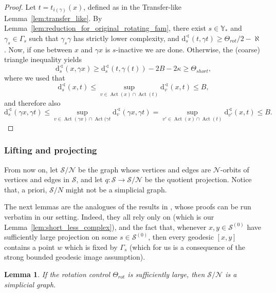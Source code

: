 \documentclass[svgnames]{amsart}
\theoremstyle{plain}
\newtheorem{lemma}[thm]{Lemma}
\theoremstyle{definition}
\newcommand{\dist}{\mathrm{d}}
\newcommand{\Act}{\operatorname{Act}}
\newcommand{\N}{\mathcal{N}}
\newcommand{\calS}{\mathcal{S}}
\renewcommand{\angle}{\sphericalangle}
\begin{document}
\begin{proof}
Let $t=t_{i(\gamma)}(x)$, defined as in the Transfer-like Lemma~\ref{lem:transfer_like}. By Lemma~\ref{lem:reduction_for_original_rotating_fam}, there exist $s \in \mathbb{Y}_*$ and $\gamma_s\in\Gamma_s$ such that $\gamma_s\gamma$ has strictly lower complexity, and $\dist^\angle_s(t, \gamma t)\ge \Theta_{rot}/2-\aleph$. Now, if one between $x$ and $\gamma x$ is $s$-inactive we are done. Otherwise, the (coarse) triangle inequality yields
$$\dist^\angle_s(x,\gamma x)\ge \dist^\angle_s(t,\gamma (t))-2 B-2\kappa \ge \Theta_{short},$$
where we used that 
$$\dist^\angle_s(x,t)\le \sup_{v\in\Act(x)\cap \Act(t)}\dist^\angle_v(x,t)\le B,$$
and therefore also 
$$\dist^\angle_s(\gamma x,\gamma t)\le \sup_{v\in\Act(\gamma x)\cap \Act(\gamma t}\dist^\angle_v(\gamma x,\gamma t)=\sup_{v'\in\Act(x)\cap \Act(t)}\dist^\angle_{v'}(x,t)\le B.$$
\end{proof}




\subsubsection{Lifting and projecting}
From now on, let $\calS/\N$ be the graph whose vertices and edges are $\N$-orbits of vertices and edges in $\calS$, and let $q\colon \calS\to \calS/\N$ be the quotient projection. Notice that, a priori, $\calS/N$ might not be a simplicial graph.

The next lemmas are the analogues of the results in \cite[Section 4]{dfdt}, whose proofs can be run verbatim in our setting. Indeed, they all rely only on \cite[Corollary 3.6]{dfdt} (which is our Lemma~\ref{lem:short_less_complex}), and the fact that, whenever $x,y\in\calS^{(0)}$ have sufficiently large projection on some $s\in \calS^{(0)}$, then every geodesic $[x,y]$ contains a point $w$ which is fixed by $\Gamma_s$ (which for us is a consequence of the strong bounded geodesic image assumption). 

\begin{lemma}\label{lem:simplicial_quotient_graph}
 If the rotation control $\Theta_{rot}$ is sufficiently large, then $\calS/\N$ is a simplicial graph.
\end{lemma}
\end{document}
